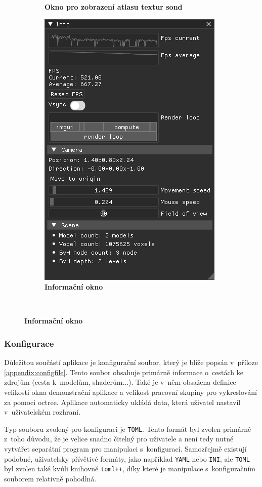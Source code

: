 \begin{figure}[H]
\begin{subfigure}[t]{.49\textwidth}
		\caption{\textbf{Okno pro zobrazení atlasu textur sond}}
		\label{fig:probe_ui}
	\end{subfigure}
		\begin{subfigure}[t]{1\textwidth}
			\centering
        	\includegraphics[scale=1]{images/dp_ui_info.png}
        	\caption{\textbf{Informační okno}}
        	\label{fig:info_ui}
	\end{subfigure}\\
	\captionsetup{justification=centering}
	\label{fig:UI}
\end{figure}


\subsubsection{Konfigurace}
Důležitou součástí aplikace je konfigurační soubor, který je blíže popsán v~příloze \ref{appendix:configfile}. Tento soubor obsahuje primárně informace o~cestách ke zdrojům (cesta k~modelům, shaderům...). Také je v~něm obsažena definice velikosti okna demonstrační aplikace a velikost pracovní skupiny pro vykreslování za pomoci octree. Aplikace automaticky ukládá data, která uživatel nastavil v~uživatelském rozhraní.

Typ souboru zvolený pro konfiguraci je \texttt{TOML}. Tento formát byl zvolen primárně z~toho důvodu, že je velice snadno čitelný pro uživatele a není tedy nutné vytvářet separátní program pro manipulaci s~konfigurací. Samozřejmě existují podobné, uživatelsky přívětivé formáty, jako například \texttt{YAML} nebo \texttt{INI}, ale \texttt{TOML} byl zvolen také kvůli knihovně \texttt{toml++}, díky které je manipulace s~konfiguračním souborem relativně pohodlná.


